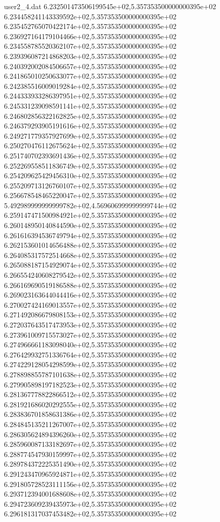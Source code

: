 \begin{filecontents}{user2_4.dat}
6.232501473506199545e+02,5.357353500000000395e+02
6.234458241143339592e+02,5.357353500000000395e+02
6.235452765070422174e+02,5.357353500000000395e+02
6.236927164179104466e+02,5.357353500000000395e+02
6.234558785520362107e+02,5.357353500000000395e+02
6.239396087214868203e+02,5.357353500000000395e+02
6.240392002084506657e+02,5.357353500000000395e+02
6.241865010250633077e+02,5.357353500000000395e+02
6.242385516009019284e+02,5.357353500000000395e+02
6.244333933286397951e+02,5.357353500000000395e+02
6.245331239098591141e+02,5.357353500000000395e+02
6.246802856322162825e+02,5.357353500000000395e+02
6.246379293905191616e+02,5.357353500000000395e+02
6.249271779357927699e+02,5.357353500000000395e+02
6.250270476112675624e+02,5.357353500000000395e+02
6.251740702393691436e+02,5.357353500000000395e+02
6.252269558511836749e+02,5.357353500000000395e+02
6.254209625429456310e+02,5.357353500000000395e+02
6.255209713126760107e+02,5.357353500000000395e+02
6.256678548465220047e+02,5.357353500000000395e+02
5.492989999999999782e+02,4.569606999999999744e+02
6.259147471500984921e+02,5.357353500000000395e+02
6.260148950140844590e+02,5.357353500000000395e+02
6.261616394536749794e+02,5.357353500000000395e+02
6.262153601014656488e+02,5.357353500000000395e+02
6.264085317572514668e+02,5.357353500000000395e+02
6.265088187154929074e+02,5.357353500000000395e+02
6.266554240608279542e+02,5.357353500000000395e+02
6.266169690519186588e+02,5.357353500000000395e+02
6.269023163644044416e+02,5.357353500000000395e+02
6.270027424169013557e+02,5.357353500000000395e+02
6.271492086679808153e+02,5.357353500000000395e+02
6.272037643517473953e+02,5.357353500000000395e+02
6.273961009715573027e+02,5.357353500000000395e+02
6.274966661183098040e+02,5.357353500000000395e+02
6.276429932751336764e+02,5.357353500000000395e+02
6.274229128054298599e+02,5.357353500000000395e+02
6.278898855787101638e+02,5.357353500000000395e+02
6.279905898197182523e+02,5.357353500000000395e+02
6.281367778822866512e+02,5.357353500000000395e+02
6.281921686020292555e+02,5.357353500000000395e+02
6.283836701858631386e+02,5.357353500000000395e+02
6.284845135211267007e+02,5.357353500000000395e+02
6.286305624894396260e+02,5.357353500000000395e+02
6.285960087133182697e+02,5.357353500000000395e+02
6.288774547930159997e+02,5.357353500000000395e+02
6.289784372225351490e+02,5.357353500000000395e+02
6.291243470965924871e+02,5.357353500000000395e+02
6.291805728523111156e+02,5.357353500000000395e+02
6.293712394001688608e+02,5.357353500000000395e+02
6.294723609239435973e+02,5.357353500000000395e+02
6.296181317037453482e+02,5.357353500000000395e+02

\end{filecontents}
